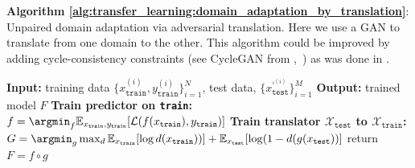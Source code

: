 \begin{algorithm}[h]
\SetAlgoVlined
\DontPrintSemicolon
\caption{{\bf Algorithm \ref{alg:transfer_learning:domain_adaptation_by_translation}}: Unpaired domain adaptation via adversarial translation. Here we use a GAN to translate from one domain to the other. This algorithm could be improved by adding cycle-consistency constraints (see CycleGAN from \chap{\ref{chapter:conditional_generative_models}},~\cite{CycleGAN2017}) as was done in \cite{hoffman2018cycada}.}
\fakealgorithmcaption{}
\label{alg:transfer_learning:domain_adaptation_by_translation}
{\bf Input:} training data $\{x_{\texttt{train}}^{(i)},y_{\texttt{train}}^{(i)}\}_{i=1}^N$, test data, $\{x_{\texttt{test}}^{\prime^{(i)}}\}_{i=1}^M$\;
{\bf Output:} trained model $F$\;
{\bf Train predictor on \texttt{train}:}
    $f = \argmin_{f} \mathbb{E}_{x_{\texttt{train}},y_{\texttt{train}}}[\mathcal{L}(f(x_{\texttt{train}}),y_{\texttt{train}})]$\;
{\bf Train translator $\mathcal{X}_{\texttt{test}}$ to $\mathcal{X}_{\texttt{train}}$:}
    $G = \argmin_g \max_d \mathbb{E}_{x_{\texttt{train}}}[\log d(x_{\texttt{train}}))] + \mathbb{E}_{x_{\texttt{test}}}[\log(1-d(g(x_{\texttt{test}}))]$\;
return $F = f \circ g$
\end{algorithm}





